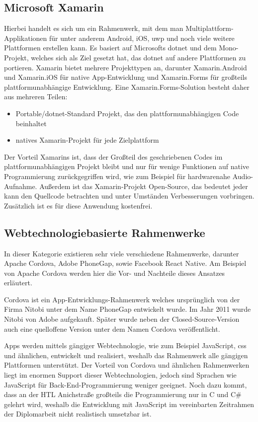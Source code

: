 \subsection{Microsoft Xamarin}
Hierbei handelt es sich um ein Rahmenwerk, mit dem man Multiplattform-Applikationen für unter anderem Android, iOS, \ac{uwp} und noch viele weitere Plattformen erstellen kann.
Es basiert auf Microsofts \ac{dotnet} und dem Mono-Projekt, welches sich als Ziel gesetzt hat, das \ac{dotnet} auf andere Plattformen zu portieren.
Xamarin bietet mehrere Projekttypen an, darunter Xamarin.Android und Xamarin.iOS für native App-Entwicklung und Xamarin.Forms für großteils plattformunabhängige Entwicklung.
Eine Xamarin.Forms-Solution besteht daher aus mehreren Teilen:
\begin{itemize}
    \item Portable/\acs{dotnet}-Standard Projekt, das den plattformunabhängigen Code beinhaltet
    \item natives Xamarin-Projekt für jede Zielplattform
\end{itemize}
Der Vorteil Xamarins ist, dass der Großteil des geschriebenen Codes im plattformunabhängigen Projekt bleibt und nur für wenige Funktionen auf native Programmierung zurückgegriffen wird, wie zum Beispiel für hardwarenahe Audio-Aufnahme.
Außerdem ist das Xamarin-Projekt Open-Source, das bedeutet jeder kann den Quellcode betrachten und unter Umständen Verbesserungen vorbringen.
Zusätzlich ist es für diese Anwendung kostenfrei.

\subsection{Webtechnologiebasierte Rahmenwerke}
In dieser Kategorie existieren sehr viele verschiedene Rahmenwerke, darunter Apache Cordova, Adobe PhoneGap, sowie Facebook React Native.
Am Beispiel von Apache Cordova werden hier die Vor- und Nachteile dieses Ansatzes erläutert.

Cordova ist ein App-Entwicklungs-Rahmenwerk welches ursprünglich von der Firma Nitobi unter dem Name PhoneGap entwickelt wurde.
Im Jahr 2011 wurde Nitobi von Adobe aufgekauft.
Später wurde neben der Closed-Source-Version auch eine quelloffene Version unter dem Namen Cordova veröffentlicht. \cite[vgl.][]{adobe-phonegap}\par

Apps werden mittels gängiger Webtechnologie, wie zum Beispiel JavaScript, \acs{css} und ähnlichen, entwickelt und realisiert, weshalb das Rahmenwerk alle gängigen Plattformen unterstützt.
Der Vorteil von Cordova und ähnlichen Rahmenwerken liegt im enormen Support dieser Webtechnologien, jedoch sind Sprachen wie JavaScript für Back-End-Programmierung weniger geeignet.
Noch dazu kommt, dass an der HTL Anichstraße großteils die Programmierung nur in C und C\# gelehrt wird, weshalb die Entwicklung mit JavaScript im vereinbarten Zeitrahmen der Diplomarbeit nicht realistisch umsetzbar ist.

